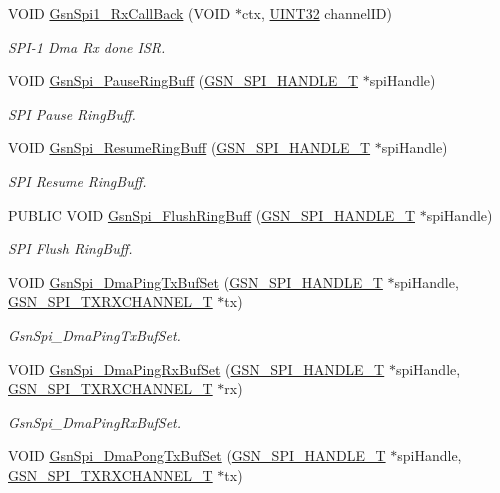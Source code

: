 \begin{DoxyCompactItemize}
VOID \hyperlink{a00655_ga591fe7e46faaf3a5875c60705bd58fba}{GsnSpi1\_\-RxCallBack} (VOID $\ast$ctx, \hyperlink{a00660_gae1e6edbbc26d6fbc71a90190d0266018}{UINT32} channelID)
\begin{DoxyCompactList}\small\item\em SPI-\/1 Dma Rx done ISR. \end{DoxyCompactList}\item 
VOID \hyperlink{a00655_gaff8470ba74c4dcca916bbeff57e4bd7d}{GsnSpi\_\-PauseRingBuff} (\hyperlink{a00238}{GSN\_\-SPI\_\-HANDLE\_\-T} $\ast$spiHandle)
\begin{DoxyCompactList}\small\item\em SPI Pause RingBuff. \end{DoxyCompactList}\item 
VOID \hyperlink{a00655_ga0d08ec80f335e1b0ed90f7c59367f9b2}{GsnSpi\_\-ResumeRingBuff} (\hyperlink{a00238}{GSN\_\-SPI\_\-HANDLE\_\-T} $\ast$spiHandle)
\begin{DoxyCompactList}\small\item\em SPI Resume RingBuff. \end{DoxyCompactList}\item 
PUBLIC VOID \hyperlink{a00655_ga1c2eb2ee1ac85757bc73cee12de1f83a}{GsnSpi\_\-FlushRingBuff} (\hyperlink{a00238}{GSN\_\-SPI\_\-HANDLE\_\-T} $\ast$spiHandle)
\begin{DoxyCompactList}\small\item\em SPI Flush RingBuff. \end{DoxyCompactList}\item 
VOID \hyperlink{a00655_ga3b883bf551a2d5a45324f2c9fb192dde}{GsnSpi\_\-DmaPingTxBufSet} (\hyperlink{a00238}{GSN\_\-SPI\_\-HANDLE\_\-T} $\ast$spiHandle, \hyperlink{a00241}{GSN\_\-SPI\_\-TXRXCHANNEL\_\-T} $\ast$tx)
\begin{DoxyCompactList}\small\item\em GsnSpi\_\-DmaPingTxBufSet. \end{DoxyCompactList}\item 
VOID \hyperlink{a00655_ga1240aab47d221d687c55d959f9338f38}{GsnSpi\_\-DmaPingRxBufSet} (\hyperlink{a00238}{GSN\_\-SPI\_\-HANDLE\_\-T} $\ast$spiHandle, \hyperlink{a00241}{GSN\_\-SPI\_\-TXRXCHANNEL\_\-T} $\ast$rx)
\begin{DoxyCompactList}\small\item\em GsnSpi\_\-DmaPingRxBufSet. \end{DoxyCompactList}\item 
VOID \hyperlink{a00655_ga12f4ac188844f68f5b615c317544d789}{GsnSpi\_\-DmaPongTxBufSet} (\hyperlink{a00238}{GSN\_\-SPI\_\-HANDLE\_\-T} $\ast$spiHandle, \hyperlink{a00241}{GSN\_\-SPI\_\-TXRXCHANNEL\_\-T} $\ast$tx)

\end{DoxyCompactItemize}
